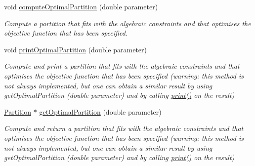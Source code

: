 \begin{DoxyCompactItemize}
\item 
void \hyperlink{classGraph_a484517e8cda854dbaf158d7bdae19fe7}{compute\-Optimal\-Partition} (double parameter)
\begin{DoxyCompactList}\small\item\em Compute a partition that fits with the algebraic constraints and that optimises the objective function that has been specified. \end{DoxyCompactList}\item 
void \hyperlink{classGraph_a493dd2e19a08dd65ca49ac18944ad2cb}{print\-Optimal\-Partition} (double parameter)
\begin{DoxyCompactList}\small\item\em Compute and print a partition that fits with the algebraic constraints and that optimises the objective function that has been specified (warning\-: this method is not always implemented, but one can obtain a similar result by using get\-Optimal\-Partition (double parameter) and by calling \hyperlink{classGraph_a2ecf3dd3c4897aa924da8e5c221a8509}{print()} on the result) \end{DoxyCompactList}\item 
\hyperlink{classPartition}{Partition} $\ast$ \hyperlink{classGraph_a044d5401c498aa0c2d213986e7d747ca}{get\-Optimal\-Partition} (double parameter)
\begin{DoxyCompactList}\small\item\em Compute and return a partition that fits with the algebraic constraints and that optimises the objective function that has been specified (warning\-: this method is not always implemented, but one can obtain a similar result by using get\-Optimal\-Partition (double parameter) and by calling \hyperlink{classGraph_a2ecf3dd3c4897aa924da8e5c221a8509}{print()} on the result) \end{DoxyCompactList}\end{DoxyCompactItemize}
